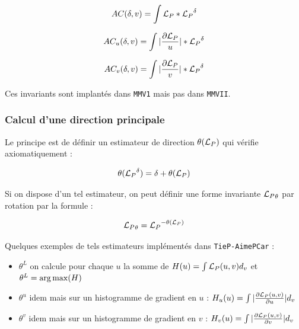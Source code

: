 \begin{equation}
    AC(\delta,v) =  \int {\mathcal L_P} * {\mathcal L_P}^\delta
\end{equation}

\begin{equation}
    AC_u(\delta,v) =  \int |\frac{\partial {\mathcal L_P}}{u}| * {\mathcal L_P}^\delta
\end{equation}

\begin{equation}
    AC_v(\delta,v) =  \int |\frac{\partial {\mathcal L_P}}{v}| * {\mathcal L_P}^\delta
\end{equation}

Ces invariants sont implant\'es dans {\tt MMV1} mais pas dans {\tt MMVII}.


\subsubsection{Calcul d'une direction principale}

Le principe est de d\'efinir un estimateur de direction $\theta({\mathcal L_P})$ qui v\'erifie
axiomatiquement :

\begin{equation}
     \theta ({\mathcal L_P}^\delta) = \delta + \theta ({\mathcal L_P})
\end{equation}

Si on dispose d'un tel estimateur, on peut d\'efinir une forme invariante ${\mathcal L_P}_\theta$ par rotation
par la formule :


\begin{equation}
     {\mathcal L_P}_\theta = {\mathcal L_P}^{-\theta({\mathcal L_P})}
\end{equation}

Quelques exemples de tels estimateurs impl\'ement\'es dans  {\tt TieP-AimePCar} :

\begin{itemize}
   \item $\theta^L$  on calcule pour chaque $u$ la somme de $H(u) = \int {\mathcal L_P}(u,v) d_v$
         et  $\theta^L = \operatorname*{arg\,max} (H)$

   \item $\theta^u$  idem mais sur un histogramme de gradient en $u$ :  $H_u(u) = \int |\frac{ \partial {\mathcal L_P}(u,v)}{\partial u}| d_v$

   \item $\theta^v$  idem mais sur un histogramme de gradient en $v$ :  $H_v(u) = \int |\frac{ \partial {\mathcal L_P}(u,v)}{\partial v}| d_v$
\end{itemize}


